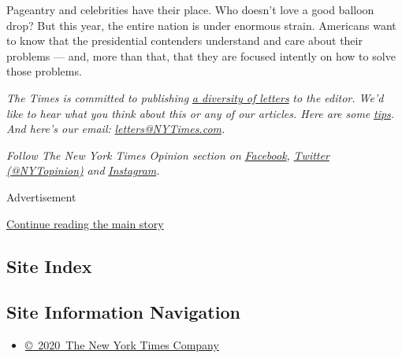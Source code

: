 Pageantry and celebrities have their place. Who doesn't love a good
balloon drop? But this year, the entire nation is under enormous strain.
Americans want to know that the presidential contenders understand and
care about their problems --- and, more than that, that they are focused
intently on how to solve those problems.

\emph{The Times is committed to publishing}
\href{https://www.nytimes3xbfgragh.onion/2019/01/31/opinion/letters/letters-to-editor-new-york-times-women.html}{\emph{a
diversity of letters}} \emph{to the editor. We'd like to hear what you
think about this or any of our articles. Here are some}
\href{https://help.nytimes3xbfgragh.onion/hc/en-us/articles/115014925288-How-to-submit-a-letter-to-the-editor}{\emph{tips}}\emph{.
And here's our email:}
\href{mailto:letters@NYTimes.com}{\emph{letters@NYTimes.com}}\emph{.}

\emph{Follow The New York Times Opinion section on}
\href{https://www.facebookcorewwwi.onion/nytopinion}{\emph{Facebook}}\emph{,}
\href{http://twitter.com/NYTOpinion}{\emph{Twitter (@NYTopinion)}}
\emph{and}
\href{https://www.instagram.com/nytopinion/}{\emph{Instagram}}\emph{.}

Advertisement

\protect\hyperlink{after-bottom}{Continue reading the main story}

\hypertarget{site-index}{%
\subsection{Site Index}\label{site-index}}

\hypertarget{site-information-navigation}{%
\subsection{Site Information
Navigation}\label{site-information-navigation}}

\begin{itemize}
\tightlist
\item
  \href{https://help.nytimes3xbfgragh.onion/hc/en-us/articles/115014792127-Copyright-notice}{©~2020~The
  New York Times Company}
\end{itemize}

